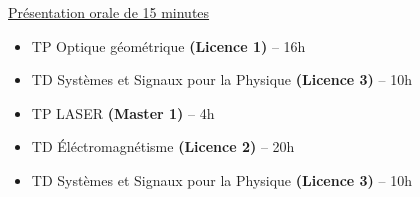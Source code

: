 \documentclass[9pt,a4paper,academicons]{altacv}
\begin{document}
\begin{fullwidth}
  {}

  \href{https://doi.org/10.1109/CLEO/Europe-EQEC57999.2023.10231566}{Présentation orale de 15 minutes}

  \newpage



  \begin{itemize}
    \item TP Optique géométrique \textbf{(Licence 1)} -- 16h
    \item TD Systèmes et Signaux pour la Physique \textbf{(Licence 3)} -- 10h

  \end{itemize}

  \divider


  \begin{itemize}
    \item TP LASER \textbf{(Master 1)} -- 4h
    \item TD \'Eléctromagnétisme \textbf{(Licence 2)} -- 20h
    \item TD Systèmes et Signaux pour la Physique \textbf{(Licence 3)} -- 10h

  \end{itemize}
  \divider
\end{fullwidth}
\end{document}
